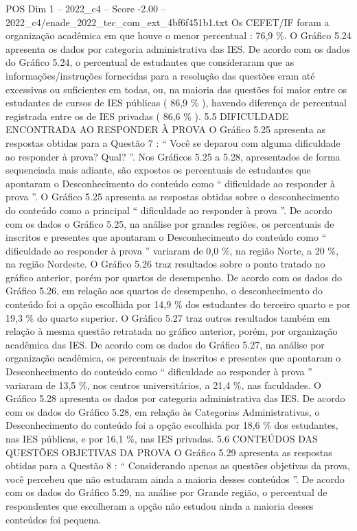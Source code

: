 \begin{textsample}{POS Dim 1 – 2022\_c4 – Score -2.00 – 2022\_c4/enade\_2022\_tec\_com\_ext\_4bf6f451b1.txt}
Os CEFET/IF foram a organização acadêmica em que houve o menor percentual : 76,9 \%.
O Gráfico 5.24 apresenta os dados por categoria administrativa das IES.
De acordo com os dados do Gráfico 5.24, o percentual de estudantes que consideraram que as informações/instruções fornecidas para a resolução das questões eram até excessivas ou suficientes em todas, ou, na maioria das questões foi maior entre os estudantes de cursos de IES públicas ( 86,9 \% ), havendo diferença de percentual registrada entre os de IES privadas ( 86,6 \% ). 5.5 DIFICULDADE ENCONTRADA AO RESPONDER À PROVA O Gráfico 5.25 apresenta as respostas obtidas para a Questão 7 : “ Você se deparou com alguma dificuldade ao responder à prova?
Qual? ”.
Nos Gráficos 5.25 a 5.28, apresentados de forma sequenciada mais adiante, são expostos os percentuais de estudantes que apontaram o Desconhecimento do conteúdo como “ dificuldade ao responder à prova ”.
O Gráfico 5.25 apresenta as respostas obtidas sobre o desconhecimento do conteúdo como a principal “ dificuldade ao responder à prova ”.
De acordo com os dados o Gráfico 5.25, na análise por grandes regiões, os percentuais de inscritos e presentes que apontaram o Desconhecimento do conteúdo como “ dificuldade ao responder à prova ” variaram de 0,0 \%, na região Norte, a 20 \%, na região Nordeste.
O Gráfico 5.26 traz resultados sobre o ponto tratado no gráfico anterior, porém por quartos de desempenho.
De acordo com os dados do Gráfico 5.26, em relação aos quartos de desempenho, o desconhecimento do conteúdo foi a opção escolhida por 14,9 \% dos estudantes do terceiro quarto e por 19,3 \% do quarto superior.
O Gráfico 5.27 traz outros resultados também em relação à mesma questão retratada no gráfico anterior, porém, por organização acadêmica das IES.
De acordo com os dados do Gráfico 5.27, na análise por organização acadêmica, os percentuais de inscritos e presentes que apontaram o Desconhecimento do conteúdo como “ dificuldade ao responder à prova ” variaram de 13,5 \%, nos centros universitários, a 21,4 \%, nas faculdades.
O Gráfico 5.28 apresenta os dados por categoria administrativa das IES.
De acordo com os dados do Gráfico 5.28, em relação às Categorias Administrativas, o Desconhecimento do conteúdo foi a opção escolhida por 18,6 \% dos estudantes, nas IES públicas, e por 16,1 \%, nas IES privadas. 5.6 CONTEÚDOS DAS QUESTÕES OBJETIVAS DA PROVA O Gráfico 5.29 apresenta as respostas obtidas para a Questão 8 : “ Considerando apenas as questões objetivas da prova, você percebeu que não estudaram ainda a maioria desses conteúdos ”.
De acordo com os dados do Gráfico 5.29, na análise por Grande região, o percentual de respondentes que escolheram a opção não estudou ainda a maioria desses conteúdos foi pequena.

\end{textsample}
